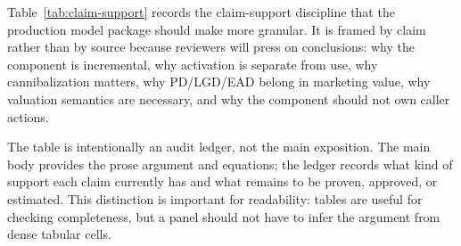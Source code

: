 \documentclass[11pt]{article}
\newcommand{\1}{\mathbf{1}}
\begin{document}
Table~\ref{tab:claim-support} records the claim-support discipline that the
production model package should make more granular. It is framed by claim
rather than by source because reviewers will press on conclusions: why the
component is incremental, why activation is separate from use, why
cannibalization matters, why PD/LGD/EAD belong in marketing value, why
valuation semantics are necessary, and why the component should not own caller
actions.

The table is intentionally an audit ledger, not the main exposition. The main
body provides the prose argument and equations; the ledger records what kind
of support each claim currently has and what remains to be proven, approved,
or estimated. This distinction is important for readability: tables are useful
for checking completeness, but a panel should not have to infer the argument
from dense tabular cells.
\end{document}
